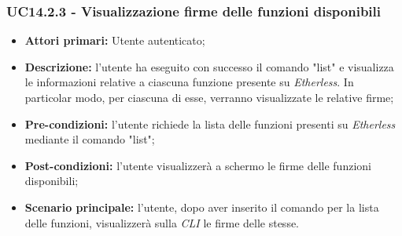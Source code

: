 \subsubsection{UC14.2.3 - Visualizzazione firme delle funzioni disponibili}
\begin{itemize}
	\item \textbf{Attori primari:} Utente autenticato;
	\item \textbf{Descrizione:} l'utente ha eseguito con successo il comando "list" e visualizza le informazioni relative a ciascuna funzione presente su \textit{Etherless}. In particolar modo, per ciascuna di esse, verranno visualizzate le relative firme; 
	\item \textbf{Pre-condizioni:} l'utente richiede la lista delle funzioni presenti su \textit{Etherless} mediante il comando "list"; 
	\item \textbf{Post-condizioni:} l'utente visualizzerà a schermo le firme delle funzioni disponibili;
	\item \textbf{Scenario principale:} l'utente, dopo aver inserito il comando per la lista delle funzioni, visualizzerà sulla \textit{CLI\glo} le firme delle stesse.
\end{itemize}